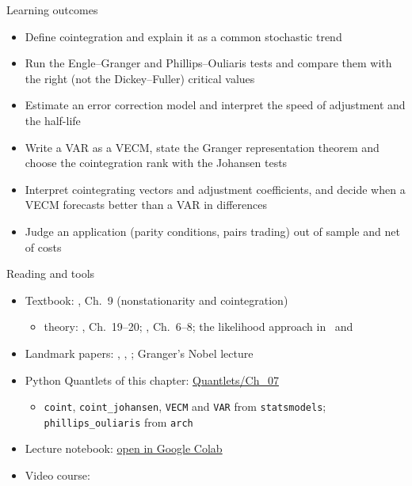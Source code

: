 \begin{frame}{Learning outcomes}
\itemsize{\small}
\begin{itemize}
    \item Define cointegration and explain it as a common stochastic trend
    \item Run the Engle--Granger and Phillips--Ouliaris tests and compare them with the right (not the Dickey--Fuller) critical values
    \item Estimate an error correction model and interpret the speed of adjustment and the half-life
    \item Write a VAR as a VECM, state the Granger representation theorem and choose the cointegration rank with the Johansen tests
    \item Interpret cointegrating vectors and adjustment coefficients, and decide when a VECM forecasts better than a VAR in differences
    \item Judge an application (parity conditions, pairs trading) out of sample and net of costs
\end{itemize}
\end{frame}

\begin{frame}{Reading and tools}
\itemsize{\small}
\begin{itemize}
    \item Textbook: , Ch.~9 (nonstationarity and cointegration)
    \begin{itemize}
        \item theory: , Ch.~19--20; , Ch.~6--8; the likelihood approach in \ and 
    \end{itemize}
    \item Landmark papers: , , ; Granger's Nobel lecture 
    \item Python Quantlets of this chapter: \href{https://github.com/danpele/Time-Series-Analysis/tree/main/Quantlets/Ch_07}{Quantlets/Ch\_07}
    \begin{itemize}
        \item \texttt{coint}, \texttt{coint\_johansen}, \texttt{VECM} and \texttt{VAR} from \texttt{statsmodels}; \texttt{phillips\_ouliaris} from \texttt{arch}
    \end{itemize}
    \item Lecture notebook: \href{\colaburl{notebooks/EN/chapter7_lecture_notebook.ipynb}}{open in Google Colab}
    \item Video course: 
\end{itemize}
\end{frame}


